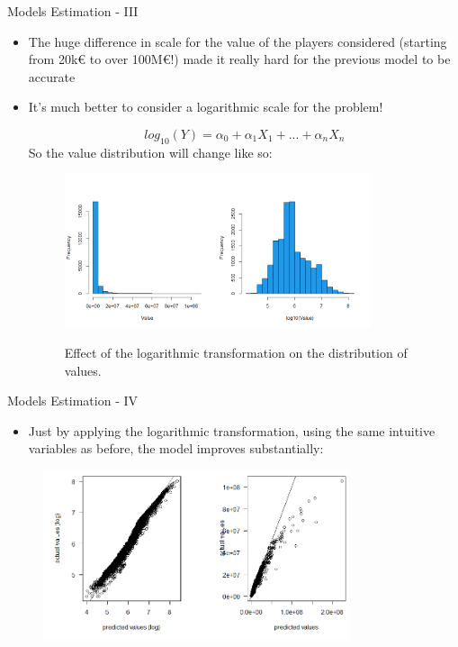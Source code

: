 \documentclass[aspectratio=169,xcolor=dvipsnames]{beamer}
\begin{document}
\begin{frame}{Models Estimation - III}
\begin{itemize}

\item The huge difference in scale for the value of the players considered (starting from 20k€ to over 100M€!) made it really hard for the previous model to be accurate

\item It's much better to consider a logarithmic scale for the problem!

\begin{equation*}
log_{10}(Y) = \alpha_0 + \alpha_1X_1 + ... + \alpha_nX_n
\end{equation*}
So the value distribution will change like so:
\begin{figure}[H] 
  \includegraphics[width=9cm]{Rplot1.png}\\
  \caption{Effect of the logarithmic transformation on the distribution of values.}
\end{figure}

\end{itemize}
\end{frame}


\begin{frame}{Models Estimation - IV}
\begin{itemize}

\item Just by applying the logarithmic transformation, using the same intuitive variables as before, the model improves substantially:
\end{itemize}

\begin{figure}[H] 
  \begin{center}
  \includegraphics[width=9cm]{predictions_log_1.png}
  \end{center}
\end{figure}

\end{frame}
\end{document}
